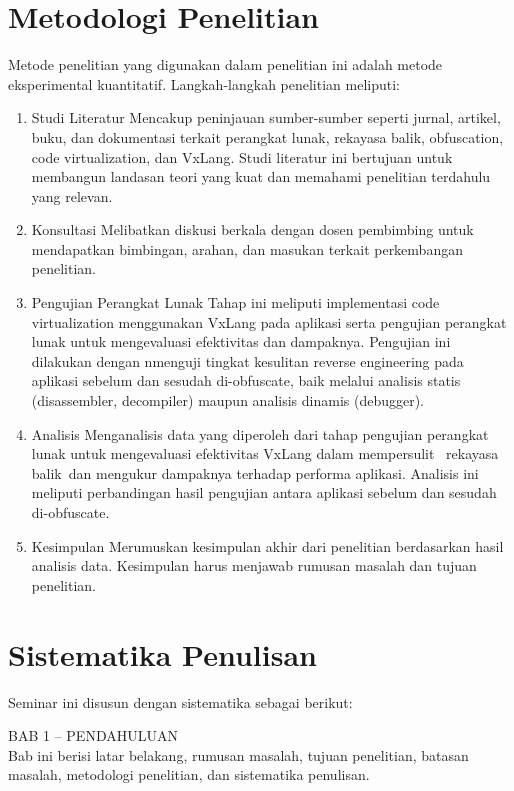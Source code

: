 \section{Metodologi Penelitian}
Metode penelitian yang digunakan dalam penelitian ini adalah metode eksperimental kuantitatif. Langkah-langkah penelitian meliputi:
\begin{enumerate}
	\item Studi Literatur
	      Mencakup peninjauan sumber-sumber seperti jurnal, artikel, buku, dan dokumentasi terkait perangkat lunak, rekayasa balik, obfuscation, code virtualization, dan VxLang. Studi literatur ini bertujuan untuk membangun landasan teori yang kuat dan memahami penelitian terdahulu yang relevan.
	\item Konsultasi
	      Melibatkan diskusi berkala dengan dosen pembimbing untuk mendapatkan bimbingan, arahan, dan masukan terkait perkembangan penelitian.
	\item Pengujian Perangkat Lunak
	      Tahap ini meliputi implementasi code virtualization menggunakan VxLang pada aplikasi serta pengujian perangkat lunak untuk mengevaluasi efektivitas dan dampaknya. Pengujian ini dilakukan dengan nmenguji tingkat kesulitan reverse engineering pada aplikasi sebelum dan sesudah di-obfuscate, baik melalui analisis statis (disassembler, decompiler) maupun analisis dinamis (debugger).
	\item Analisis
	      Menganalisis data yang diperoleh dari tahap pengujian perangkat lunak untuk mengevaluasi efektivitas VxLang dalam mempersulit  rekayasa balik dan mengukur dampaknya terhadap performa aplikasi. Analisis ini meliputi perbandingan hasil pengujian antara aplikasi sebelum dan sesudah di-obfuscate.
	\item Kesimpulan
	      Merumuskan kesimpulan akhir dari penelitian berdasarkan hasil analisis data. Kesimpulan harus menjawab rumusan masalah dan tujuan penelitian.
\end{enumerate}

\section{Sistematika Penulisan}
Seminar ini disusun dengan sistematika sebagai berikut:

BAB 1 – PENDAHULUAN \\
Bab ini berisi latar belakang, rumusan masalah, tujuan penelitian, batasan masalah, metodologi penelitian, dan sistematika penulisan.

